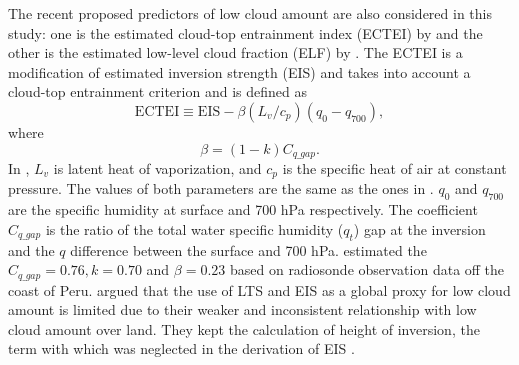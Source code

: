 The recent proposed predictors of low cloud amount are also considered in this study: one is the estimated cloud-top entrainment index (ECTEI) by \cite{Kawai2017} and the other is the estimated low-level cloud fraction (ELF) by \cite{Park2019}. 
The ECTEI is a modification of estimated inversion strength (EIS) and takes into account a cloud-top entrainment criterion and is defined as
\begin{equation}
    \mathrm{ECTEI} \equiv \mathrm{EIS} - \beta\left(L_v / c_{p}\right)\left(q_{0}-q_{700}\right),
    \label{eq:ectei_Kawai}
\end{equation}
where
\begin{equation}
    \beta=(1-k) C_{q\_gap}.
\end{equation}
In , $L_v$ is latent heat of vaporization, and $c_p$ is the specific heat of air at constant pressure. The values of both parameters are the same as the ones in  . $q_{0}$ and $q_{700}$ are the specific humidity at surface and 700 hPa respectively. The coefficient $C_{q\_gap}$ is the ratio of the total water specific humidity ($q_t$) gap at
the inversion and the $q$ difference between the surface
and 700 hPa. \cite{Kawai2017} estimated the $C_{q\_gap} = 0.76, k=0.70 $ and $\beta = 0.23$ based on radiosonde observation data off the coast of Peru. 
\cite{Park2019} argued that the use of LTS and EIS as a global proxy for low cloud amount is limited due to their weaker and inconsistent relationship with low cloud amount over land. They kept the calculation of height of inversion, the term with which was neglected in the derivation of EIS \citep{Wood2006}.
